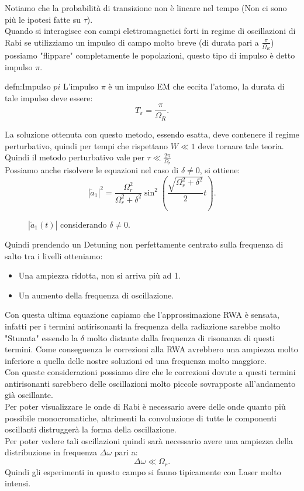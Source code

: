 Notiamo che la probabilità di transizione non è lineare nel tempo (Non ci sono più le ipotesi fatte su $\tau$).\\
Quando si interagisce con campi elettromagnetici forti in regime di oscillazioni di Rabi se utilizziamo un impulso di campo molto breve (di durata pari a $\frac{\pi}{\Omega_R}$) possiamo "flippare" completamente le popolazioni, questo tipo di impulso è detto impulso $\pi$.
\begin{defn}[Impulso $\pi$]{defn:Impulso $pi$} 
L'impulso $\pi$  è un impulso EM che eccita l'atomo, la durata di tale impulso deve essere:
\[
T_{\pi} = \frac{\pi}{\Omega_R}
.\] 
\end{defn}
La soluzione ottenuta con questo metodo, essendo esatta, deve contenere il regime perturbativo, quindi per tempi che rispettano $W\ll 1$ deve tornare tale teoria. 
Quindi il metodo perturbativo vale per $\tau \ll \frac{2\pi}{\Omega_r}$\\
Possiamo anche risolvere le equazioni nel caso di $\delta \neq 0$, si ottiene:
\[
\left|\tilde{a}_1\right|^2= \frac{\Omega^2_r}{\Omega_r^2+\delta^2}
\sin^2\left(\frac{\sqrt{\Omega^2_r + \delta^2}}{2}t\right)
.\] 
\begin{figure}[H]
    \centering
    \caption{$\left|\tilde{a}_1(t)\right|$ considerando $\delta\neq 0$.}
    \label{delta non nullo}
\end{figure}
\noindent
Quindi prendendo un Detuning non perfettamente centrato sulla frequenza di salto tra i livelli otteniamo:
\begin{itemize}
    \item Una ampiezza ridotta, non si arriva più ad 1.
    \item Un aumento della frequenza di oscillazione.
\end{itemize}
Con questa ultima equazione capiamo che l'approssimazione RWA è sensata, infatti per i termini antirisonanti la frequenza della radiazione sarebbe molto "Stunata" essendo la $\delta$ molto distante dalla frequenza di risonanza di questi termini. Come conseguenza le correzioni alla RWA avrebbero una ampiezza molto inferiore a quella delle nostre soluzioni ed una frequenza molto maggiore.\\
Con queste considerazioni possiamo dire che le correzioni dovute a questi termini antirisonanti sarebbero delle oscillazioni molto piccole sovrapposte all'andamento già oscillante. \\
Per poter visualizzare le onde di Rabi è necessario avere delle onde quanto più possibile monocromatiche, altrimenti la convoluzione di tutte le componenti oscillanti distruggerà la forma della oscillazione. \\
Per poter vedere tali oscillazioni quindi sarà necessario avere una ampiezza della distribuzione in frequenza $\Delta\omega$ pari a:
\[
\Delta\omega\ll\Omega_r
.\] 
Quindi gli esperimenti in questo campo si fanno tipicamente con Laser molto intensi.
